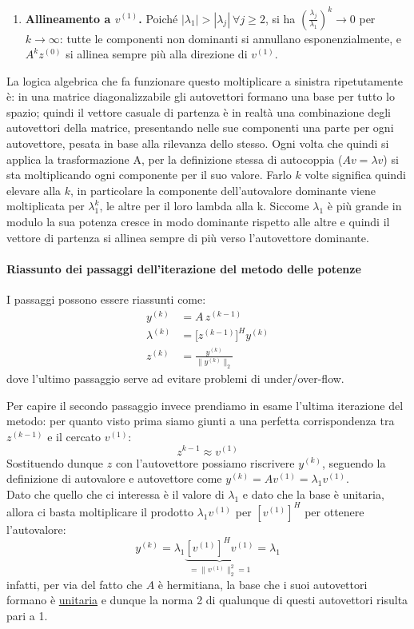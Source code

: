 \documentclass[12pt,a4paper,]{report}
\begin{document}
\begin{metodo}
\begin{nota}
\begin{enumerate}
\[        A^kz^{(0)} = \sum_{j=1}^n c_j\lambda_j^k v^{(j)} = \lambda_1^k\left(c_1v^{(1)} + \sum_{j=2}^n c_j\Big(\frac{\lambda_j}{\lambda_1}\Big)^k v^{(j)}\right).
        \]
        \item \textbf{Allineamento a $v^{(1)}$.} Poiché $|\lambda_1|>|\lambda_j|\ \forall j\geq 2$, si ha $\left(\frac{\lambda_j}{\lambda_1}\right)^k \to 0$ per $k\to\infty$: tutte le componenti non dominanti si annullano esponenzialmente, e $A^kz^{(0)}$ si allinea sempre più alla direzione di $v^{(1)}$.
    \end{enumerate}
    La logica algebrica che fa funzionare questo moltiplicare a sinistra ripetutamente è: in una matrice diagonalizzabile gli autovettori formano una base per tutto lo spazio; quindi il vettore casuale di partenza è in realtà una combinazione degli autovettori della matrice, presentando nelle sue componenti una parte per ogni autovettore, pesata in base alla rilevanza dello stesso.
    Ogni volta che quindi si applica la trasformazione A, per la definizione stessa di autocoppia ($Av=\lambda v$) si sta moltiplicando ogni componente per il suo valore.
    Farlo $k$ volte significa quindi elevare alla $k$, in particolare la componente dell'autovalore dominante viene moltiplicata per $\lambda_1^k$, le altre per il loro lambda alla k.
    Siccome $\lambda_1$ è più grande in modulo la sua potenza cresce in modo dominante rispetto alle altre e quindi il vettore di partenza si allinea sempre di più verso l'autovettore dominante.
\end{nota}
\paragraph{Riassunto dei passaggi dell'iterazione del metodo delle potenze}
I passaggi possono essere riassunti come:
\[
\boxed{
\begin{aligned}
y^{(k)} &= A \, z^{(k-1)} \\
\lambda^{(k)} &= \bigl[ z^{(k-1)} \bigr]^H y^{(k)} \\
z^{(k)} &= \frac{y^{(k)}}{\|y^{(k)}\|_2}
\end{aligned}
}
\]
dove l'ultimo passaggio serve ad evitare problemi di under/over-flow.
\end{metodo}
\begin{nota}
    Per capire il secondo passaggio invece prendiamo in esame l'ultima iterazione del metodo: per quanto visto prima siamo giunti a una perfetta corrispondenza tra $z^{(k-1)}$ e il cercato $v^{(1)}$:
    \[
    z^{k-1}\approx v^{(1)}
    \]
    Sostituendo dunque $z$ con l'autovettore possiamo riscrivere $y^{(k)}$, seguendo la definizione di autovalore e autovettore come $y^{(k)} = A v^{(1)}=\lambda_1v^{(1)}$.\\
    Dato che quello che ci interessa è il valore di $\lambda_1$ e dato che la base è unitaria, allora ci basta moltiplicare il prodotto $\lambda_1v^{(1)}$ per $[v^{(1)}]^H$ per ottenere l'autovalore:
    \[
    y^{(k)} = \lambda_1\underbrace{[v^{(1)}]^Hv^{(1)}}_{=\|v^{(1)}\|_2^2=1} = \lambda_1
    \]
    infatti, per via del fatto che $A$ è hermitiana, la base che i suoi autovettori formano è \uline{unitaria} e dunque la norma 2 di qualunque di questi autovettori risulta pari a 1.
\end{nota}
\end{document}
